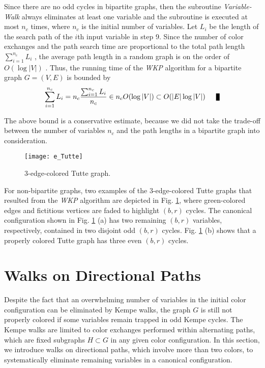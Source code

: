 \documentclass[11pt]{article}
\newenvironment{proof}[1][Proof]{\begin{trivlist}
\item[\hskip \labelsep {\bfseries #1}]}{\end{trivlist}}
\newcommand{\qed}{\nobreak \ifvmode \relax \else
      \ifdim\lastskip<1.5em \hskip-\lastskip
      \hskip1.5em plus0em minus0.5em \fi \nobreak
      \vrule height0.75em width0.5em depth0.25em\fi}
\begin{document}
\begin{proof}
Since there are no odd cycles in bipartite graphs, then the subroutine {\it Variable-Walk} always eliminates at least one variable and the subroutine is executed at most $n_c$ times, where $n_c$ is the initial number of variables. Let $L_i$  be the length of the search path of the $i$th input variable in step 9. Since the number of color exchanges and the path search time are proportional to the total path length $\sum_{i=1}^{n_c}L_i$ , the average path length in a random graph is on the order of $O(\log{|V|})$ \cite{fronczak2004average}. Thus, the running time of the {\it WKP} algorithm for a bipartite graph $G=(V,E)$  is bounded by 
\begin{align}
\sum_{i=1}^{n_c}L_i =n_c \frac{\sum_{i=1}^{n_c}L_i}{n_c} \in  n_c O(\log{|V|} )\subset O(|E|\log{|V|} ) \nonumber \qed
\end{align} 
\end{proof}
The above bound is a conservative estimate, because we did not take the trade-off between the number of variables $n_c $ and the path lengths in a bipartite graph into consideration. 

\begin{figure}[htpb]
	\centering
	\texttt{[image: e\_Tutte]}
	\caption{3-edge-colored Tutte graph.}
	\label{fig:Tutte}
\end{figure}

For non-bipartite graphs, two examples of the 3-edge-colored Tutte graphs that resulted from the {\it WKP} algorithm are depicted in Fig. \ref{fig:Tutte}, where green-colored edges and fictitious vertices are faded to highlight $(b,r)$ cycles. The canonical configuration shown in Fig. \ref{fig:Tutte} (a) has two remaining $(b,r)$ variables, respectively, contained in two disjoint odd $(b,r)$ cycles. Fig. \ref{fig:Tutte} (b) shows that a properly colored Tutte graph has three even $(b,r)$ cycles. 


\section{Walks on Directional Paths}

Despite the fact that an overwhelming number of variables in the initial color configuration can be eliminated by Kempe walks, the graph $G$ is still not properly colored if some variables remain trapped in odd Kempe cycles. The Kempe walks are limited to color exchanges performed within alternating paths, which are fixed subgraphs $H\subset G$ in any given color configuration. In this section, we introduce walks on directional paths, which involve more than two colors, to systematically eliminate remaining variables in a canonical configuration.  
\end{document}
